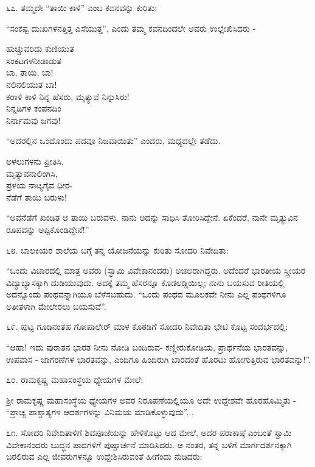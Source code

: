 ೬೭. ತಮ್ಮದೇ “ತಾಯಿ ಕಾಳಿ” ಎಂಬ ಕವನವನ್ನು ಕುರಿತು:

“ಸಂಕಷ್ಟ ದುಃಖಗಳನತ್ತಿತ್ತ ಎಸೆಯುತ್ತ”, ಎಂದು ತಮ್ಮ ಕವನದಿಂದಲೇ ಅವರು ಉಲ್ಲೇಖಿಸಿದರು -

\begin{myquote}
ಹುಚ್ಚುವರಿದು ಕುಣಿಯುತ\\ಸಂಕಟಗಳನೀಡಾಡುತ\\ಬಾ, ತಾಯಿ, ಬಾ!\\ನಲಿನಲಿಯುತ ಬಾ!\\ಕರಾಳಿ ಕಾಳಿ ನಿನ್ನ ಹೆಸರು, ಮೃತ್ಯುವೆ ನಿನ್ನುಸಿರು!\\ನಿನ್ನಡಿಗಳ ಕಂಪನದಿಂ\\ನಿರ್ನಾಮವು ಜಗವು!
\end{myquote}

“ಅದರಲ್ಲಿನ ಒಂದೊಂದು ಪದವೂ ನಿಜವಾಯಿತು” ಎಂದರು, ಮಧ್ಯದಲ್ಲೇ ತಡೆದು.

\begin{myquote}
ಅಳಲುಗಳನು ಪ್ರೀತಿಸಿ,\\ಮೃತ್ಯುವನಾಲಿಂಗಿಸಿ,\\ಪ್ರಳಯ ನಾಟ್ಯಗೈವ ಧೀರ-\\ನೆಡೆಗೆ ತಾಯಿ ಬರುಳು!
\end{myquote}

“ಅವನೆಡೆಗೆ ಖಂಡಿತ ಆ ತಾಯಿ ಬರುವಳು. ನಾನು ಅದನ್ನು ಸಾಧಿಸಿ ತೋರಿಸಿದ್ದೇನೆ. ಏಕೆಂದರೆ, ನಾನೇ ಮೃತ್ಯುವಿನ ರೂಪವನ್ನು ಅಪ್ಪಿಕೊಂಡಿದ್ದೇನೆ!” 

೬೮. ಬಾಲಕಿಯರ ಶಾಲೆಯ ಬಗ್ಗೆ ತನ್ನ ಯೋಜನೆಯನ್ನು ಕುರಿತು ಸೋದರಿ ನಿವೇದಿತಾ:

“ಒಂದು ವಿಚಾರದಲ್ಲಿ ಮಾತ್ರ ಅವರು (ಸ್ವಾಮಿ ವಿವೇಕಾನಂದರು) ಅಚಲರಾಗಿದ್ದರು. ಅದೆಂದರೆ ಭಾರತೀಯ ಸ್ತ್ರೀಯರ ವಿದ್ಯಾಭ್ಯಾಸಕ್ಕಾಗಿ ದುಡಿಯುವುದು. ಅದಕ್ಕೆ ತಮ್ಮ ಹೆಸರನ್ನೂ ಕೊಡಲಡ್ಡಿಯಿಲ್ಲ; ನಾನು ಬಯಸುವ ರೀತಿಯಲ್ಲಿ ಅದನ್ನೊಂದು ಪಂಥವನ್ನಾಗಿಯೂ ಬೆಳೆಸಬಹುದು. “ಒಂದು ಪಂಥದ ಮೂಲಕವೇ ನೀನು ಎಲ್ಲ ಪಂಥಗಳಿಗೂ ಅತೀತಳಾಗಿ ಮೇಲೇರಲು ಬಯಸುವೆ”. 

೬೯. ಪುಟ್ಟ ಗೂಡಿನಂತಹ ಗೋಪಾಲೇರ್ ಮಾಳ ಕೊಠಡಿಗೆ ಸೋದರಿ ನಿವೇದಿತಾ ಭೇಟಿ ಕೊಟ್ಟ ಸಂದರ್ಭದಲ್ಲಿ:

“ಆಹಾ! ಇದು ಪುರಾತನ ಭಾರತ ನೀನು ನೋಡಿ ಬಂದಿರುವ- ಕಣ್ಣೀರುಕೋಡಿಯ, ಪ್ರಾರ್ಥನೆಯ ಭಾರತವನ್ನು, ಉಪವಾಸ - ಜಾಗರಣೆಗಳ ಭಾರತವನ್ನು, ಎಂದಿಗೂ ಹಿಂದಿರುಗಿ ಬಾರದಂತೆ ಹೊರಟು ಹೋಗುತ್ತಿರುವ ಭಾರತವನ್ನು!”. 

೭೦. ರಾಮಕೃಷ್ಣ ಮಹಾಸಂಸ್ಥೆಯ ಧ್ಯೇಯಗಳ ಮೇಲೆ:

ಶ‍್ರೀ ರಾಮಕೃಷ್ಣ ಮಹಾಸಂಸ್ಥೆಯ ಧ್ಯೇಯಗಳ ಅವರ ನಿರೂಪಣೆಯಲ್ಲಿಯೂ ಅದೇ ಉದ್ದೇಶವೇ ಹೊರಹೊಮ್ಮಿತು - “ಪ್ರಾಚ್ಯ ಪಾಶ್ಚಾತ್ಯಗಳ ಆದರ್ಶಗಳನ್ನು ವಿನಿಮಯ ಮಾಡಿಕೊಳ್ಳುವುದು”... 

೭೧. ಸೋದರಿ ನಿವೇದಿತಾಳಿಗೆ ಶಿವಪೂಜೆಯನ್ನು ಹೇಳಿಕೊಟ್ಟು ಆದ ಮೇಲೆ, ಅದರ ಪರಾಕಾಷ್ಠೆ ಎಂಬಂತೆ ಸ್ವಾಮಿ ವಿವೇಕಾನಂದರು ಬುದ್ಧನ ಪಾದಗಳಿಗೆ ಪುಷ್ಪಾರ್ಚನೆ ಮಾಡಿಸಿದರು. ಆ ನಂತರ, ತನ್ನ ಬಳಿಗೆ ಮಾರ್ಗದರ್ಶನಕ್ಕಾಗಿ ಬರಲಿರುವ ಎಲ್ಲ ಜೀವರುಗಳನ್ನೂ ಉದ್ದೇಶಿಸಿರುವಂತೆ ಹೀಗೆಂದು ನುಡಿದರು:

